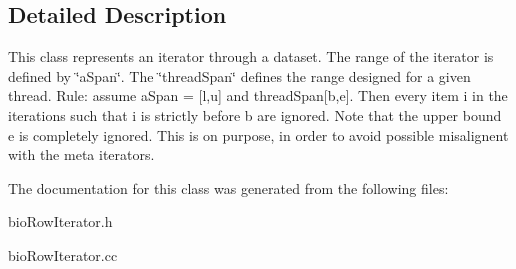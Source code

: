 \subsection{Detailed Description}
This class represents an iterator through a dataset. The range of the iterator is defined by \char`\"{}a\+Span\char`\"{}. The \char`\"{}thread\+Span\char`\"{} defines the range designed for a given thread. Rule\+: assume a\+Span = \mbox{[}l,u\mbox{]} and thread\+Span\mbox{[}b,e\mbox{]}. Then every item i in the iterations such that i is strictly before b are ignored. Note that the upper bound e is completely ignored. This is on purpose, in order to avoid possible misalignent with the meta iterators. 

The documentation for this class was generated from the following files\+:\begin{DoxyCompactItemize}
\item 
bio\+Row\+Iterator.\+h\item 
bio\+Row\+Iterator.\+cc\end{DoxyCompactItemize}
